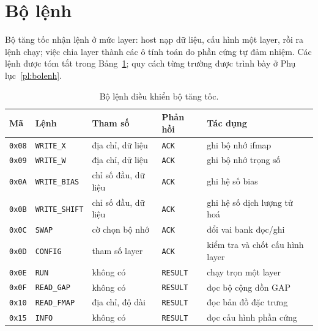 \section{Bộ lệnh}\label{sec:bolenh}
Bộ tăng tốc nhận lệnh ở mức layer: host nạp dữ liệu, cấu hình một layer, rồi ra lệnh chạy; việc chia layer thành các ô tính toán do phần cứng tự đảm nhiệm.
Các lệnh được tóm tắt trong Bảng~\ref{tab:lenh}; quy cách từng trường được trình bày ở Phụ lục~\ref{pl:bolenh}.

\begin{table}[htbp]\centering
\caption{Bộ lệnh điều khiển bộ tăng tốc.}\label{tab:lenh}
\footnotesize\setlength{\tabcolsep}{4pt}
\begin{tabular}{@{}ll>{\raggedright\arraybackslash}p{4.2cm}>{\raggedright\arraybackslash}p{2.6cm}>{\raggedright\arraybackslash}p{3.6cm}@{}}
\toprule
Mã & Lệnh & Tham số & Phản hồi & Tác dụng \\ \midrule
\texttt{0x08} & \texttt{WRITE\_X} & địa chỉ, dữ liệu & \texttt{ACK} & ghi bộ nhớ ifmap \\
\texttt{0x09} & \texttt{WRITE\_W} & địa chỉ, dữ liệu & \texttt{ACK} & ghi bộ nhớ trọng số \\
\texttt{0x0A} & \texttt{WRITE\_BIAS} & chỉ số đầu, dữ liệu & \texttt{ACK} & ghi hệ số bias \\
\texttt{0x0B} & \texttt{WRITE\_SHIFT} & chỉ số đầu, dữ liệu & \texttt{ACK} & ghi hệ số dịch lượng tử hoá \\
\texttt{0x0C} & \texttt{SWAP} & cờ chọn bộ nhớ & \texttt{ACK} & đổi vai bank đọc/ghi \\
\texttt{0x0D} & \texttt{CONFIG} & tham số layer & \texttt{ACK} & kiểm tra và chốt cấu hình layer \\
\texttt{0x0E} & \texttt{RUN} & không có & \texttt{RESULT} & chạy trọn một layer \\
\texttt{0x0F} & \texttt{READ\_GAP} & không có & \texttt{RESULT} & đọc bộ cộng dồn GAP \\
\texttt{0x10} & \texttt{READ\_FMAP} & địa chỉ, độ dài & \texttt{RESULT} & đọc bản đồ đặc trưng \\
\texttt{0x15} & \texttt{INFO} & không có & \texttt{RESULT} & đọc cấu hình phần cứng \\ \bottomrule
\end{tabular}
\end{table}

